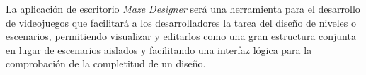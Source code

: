 La aplicación de escritorio \textit{Maze Designer} será una herramienta para el desarrollo de videojuegos que facilitará a los desarrolladores la tarea del diseño de niveles o escenarios, permitiendo visualizar y editarlos como una gran estructura conjunta en lugar de escenarios aislados y facilitando una interfaz lógica para la comprobación de la completitud de un diseño.